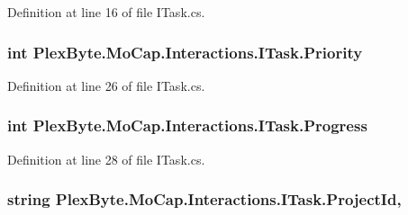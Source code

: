 Definition at line 16 of file I\+Task.\+cs.

\subsubsection[{\texorpdfstring{Priority}{Priority}}]{\setlength{\rightskip}{0pt plus 5cm}int Plex\+Byte.\+Mo\+Cap.\+Interactions.\+I\+Task.\+Priority\hspace{0.3cm}{\ttfamily [get]}}\hypertarget{interface_plex_byte_1_1_mo_cap_1_1_interactions_1_1_i_task_a98be225725e6e45fac01e73367da498e}{}\label{interface_plex_byte_1_1_mo_cap_1_1_interactions_1_1_i_task_a98be225725e6e45fac01e73367da498e}


Definition at line 26 of file I\+Task.\+cs.

\subsubsection[{\texorpdfstring{Progress}{Progress}}]{\setlength{\rightskip}{0pt plus 5cm}int Plex\+Byte.\+Mo\+Cap.\+Interactions.\+I\+Task.\+Progress\hspace{0.3cm}{\ttfamily [get]}}\hypertarget{interface_plex_byte_1_1_mo_cap_1_1_interactions_1_1_i_task_a70cd0b5fcf58544ba8f8281cb8f21e97}{}\label{interface_plex_byte_1_1_mo_cap_1_1_interactions_1_1_i_task_a70cd0b5fcf58544ba8f8281cb8f21e97}


Definition at line 28 of file I\+Task.\+cs.

\subsubsection[{\texorpdfstring{Project\+Id}{ProjectId}}]{\setlength{\rightskip}{0pt plus 5cm}string Plex\+Byte.\+Mo\+Cap.\+Interactions.\+I\+Task.\+Project\+Id\hspace{0.3cm}{\ttfamily [get]}, {\ttfamily [set]}}\hypertarget{interface_plex_byte_1_1_mo_cap_1_1_interactions_1_1_i_task_a5b3f6564ac365dfb2fe404e91a688286}{}\label{interface_plex_byte_1_1_mo_cap_1_1_interactions_1_1_i_task_a5b3f6564ac365dfb2fe404e91a688286}


